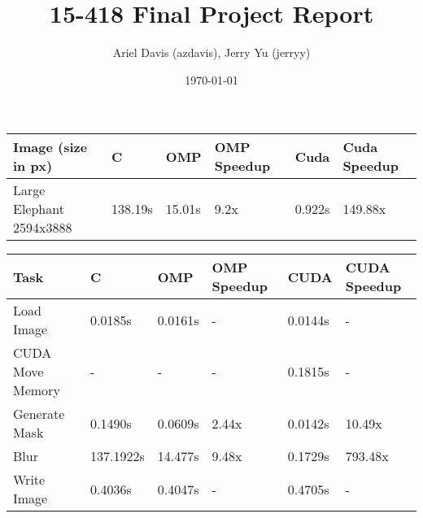 \documentclass[12pt]{article}
\author{Ariel Davis (azdavis), Jerry Yu (jerryy)}
\date{\today}
\title{15-418 Final Project Report}
\begin{document}
\maketitle

\begin{tabular}{l|l|l|l|l|l}
    Image (size in px) & C & OMP & OMP Speedup & Cuda & Cuda Speedup \\
    \hline
    Large Elephant 2594x3888 & 138.19s & 15.01s & 9.2x & 0.922s & 149.88x \\
\end{tabular}

\begin{tabular}{l|l|l|l|l|l}
    Task & C & OMP & OMP Speedup & CUDA & CUDA Speedup\\
    \hline
    Load Image & 0.0185s & 0.0161s & - & 0.0144s & -\\
    CUDA Move Memory & - & - & - & 0.1815s & -\\
    Generate Mask & 0.1490s & 0.0609s & 2.44x & 0.0142s & 10.49x\\
    Blur & 137.1922s & 14.477s & 9.48x & 0.1729s & 793.48x \\
    Write Image & 0.4036s & 0.4047s & - & 0.4705s & -
\end{tabular}
\end{document}
